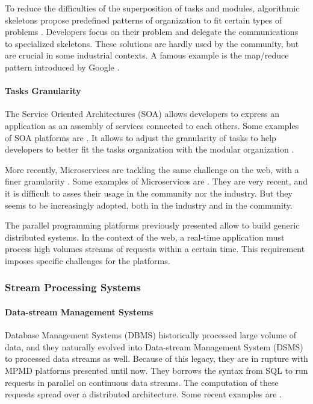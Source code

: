 To reduce the difficulties of the superposition of tasks and modules, algorithmic skeletons propose predefined patterns of organization to fit certain types of problems \cite{Cole1988, Dean2008, McCool2010, Gonzalez-Velez2010}.
Developers focus on their problem and delegate the communications to specialized skeletons.
These solutions are hardly used by the community, but are crucial in some industrial contexts.
A famous example is the map/reduce pattern introduced by Google \cite{Dean2008}.

\paragraph{Tasks Granularity}

The Service Oriented Architectures (SOA) allows developers to express an application as an assembly of services connected to each others.
Some examples of SOA platforms are .
It allows to adjust the granularity of tasks to help developers to better fit the tasks organization with the modular organization \cite{Adam2008}.

More recently, Microservices are tackling the same challenge on the web, with a finer granularity \cite{Fernandez-Villamor2010,Fowler2014,Namiot2014}.
Some examples of Microservices are .
They are very recent, and it is difficult to asses their usage in the community nor the industry.
But they seems to be increasingly adopted, both in the industry and in the community.

\separator

The parallel programming platforms previously presented allow to build generic distributed systems.
In the context of the web, a real-time application must process high volumes streams of requests within a certain time.
This requirement imposes specific challenges for the platforms.

\subsubsection{Stream Processing Systems}

\paragraph{Data-stream Management Systems}

Database Management Systems (DBMS) historically processed large volume of data, and they naturally evolved into Data-stream Management System (DSMS) to processed data streams as well.
Because of this legacy, they are in rupture with MPMD platforms presented until now.
They borrows the syntax from SQL to run requests in parallel on continuous data streams.
The computation of these requests spread over a distributed architecture.
Some recent examples are .

